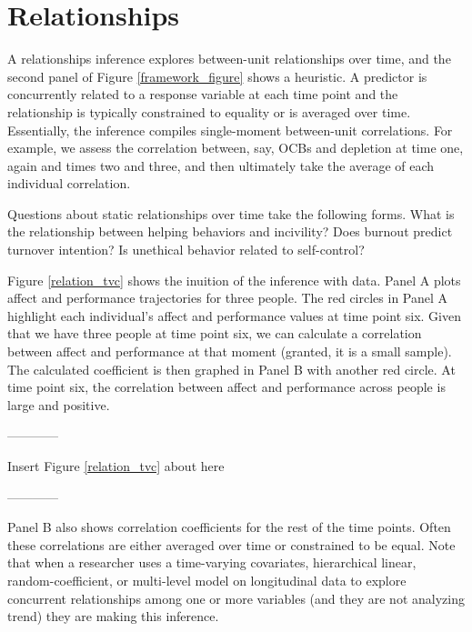 \documentclass[english,,man]{apa6}
\begin{document}
\hypertarget{relationships}{%
\section{Relationships}\label{relationships}}

A relationships inference explores between-unit relationships over time, and the second panel of Figure \ref{framework_figure} shows a heuristic. A predictor is concurrently related to a response variable at each time point and the relationship is typically constrained to equality or is averaged over time. Essentially, the inference compiles single-moment between-unit correlations. For example, we assess the correlation between, say, OCBs and depletion at time one, again and times two and three, and then ultimately take the average of each individual correlation.

Questions about static relationships over time take the following forms. What is the relationship between helping behaviors and incivility? Does burnout predict turnover intention? Is unethical behavior related to self-control?

Figure \ref{relation_tvc} shows the inuition of the inference with data. Panel A plots affect and performance trajectories for three people. The red circles in Panel A highlight each individual's affect and performance values at time point six. Given that we have three people at time point six, we can calculate a correlation between affect and performance at that moment (granted, it is a small sample). The calculated coefficient is then graphed in Panel B with another red circle. At time point six, the correlation between affect and performance across people is large and positive.

\begin{center}

------------

Insert Figure \ref{relation_tvc} about here

------------

\end{center}

Panel B also shows correlation coefficients for the rest of the time points. Often these correlations are either averaged over time or constrained to be equal. Note that when a researcher uses a time-varying covariates, hierarchical linear, random-coefficient, or multi-level model on longitudinal data to explore concurrent relationships among one or more variables (and they are not analyzing trend) they are making this inference.
\end{document}
